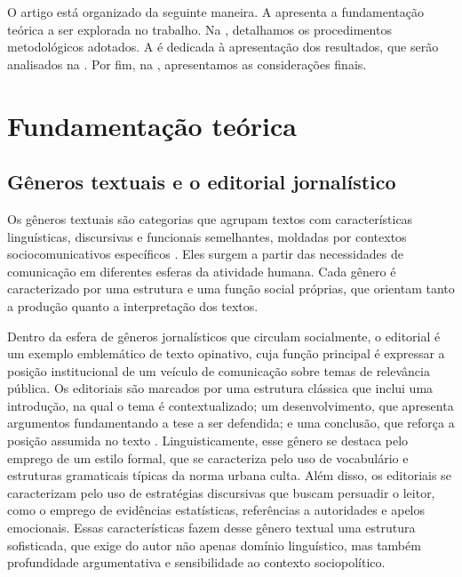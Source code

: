 \documentclass[portuguese]{textolivre}
\begin{document}
O artigo está organizado da seguinte maneira.
A  apresenta a fundamentação teórica a ser explorada no trabalho.
Na , detalhamos os procedimentos metodológicos adotados.
A  é dedicada à apresentação dos resultados, que serão analisados na .
Por fim, na , apresentamos as considerações finais.

\section{Fundamentação teórica}\label{sec-fundamentação}

\subsection{Gêneros textuais e o editorial jornalístico}\label{sec-gêneros}
Os gêneros textuais são categorias que agrupam textos com características linguísticas, discursivas e funcionais semelhantes, moldadas por contextos sociocomunicativos específicos \cite{Bakhtin1997}.
Eles surgem a partir das necessidades de comunicação em diferentes esferas da atividade humana.
Cada gênero é caracterizado por uma estrutura e uma função social próprias, que orientam tanto a produção quanto a interpretação dos textos.

Dentro da esfera de gêneros jornalísticos que circulam socialmente, o editorial é um exemplo emblemático de texto opinativo, cuja função principal é expressar a posição institucional de um veículo de comunicação sobre temas de relevância pública.
Os editoriais são marcados por uma estrutura clássica que inclui uma introdução, na qual o tema é contextualizado; um desenvolvimento, que apresenta argumentos fundamentando a tese a ser defendida; e uma conclusão, que reforça a posição assumida no texto \cite{Vieira2009}.
Linguisticamente, esse gênero se destaca pelo emprego de um estilo formal, que se caracteriza pelo uso de vocabulário e estruturas gramaticais típicas da norma urbana culta.
Além disso, os editoriais se caracterizam pelo uso de estratégias discursivas que buscam persuadir o leitor, como o emprego de evidências estatísticas, referências a autoridades e apelos emocionais.
Essas características fazem desse gênero textual uma estrutura sofisticada, que exige do autor não apenas domínio linguístico, mas também profundidade argumentativa e sensibilidade ao contexto sociopolítico.
\end{document}
